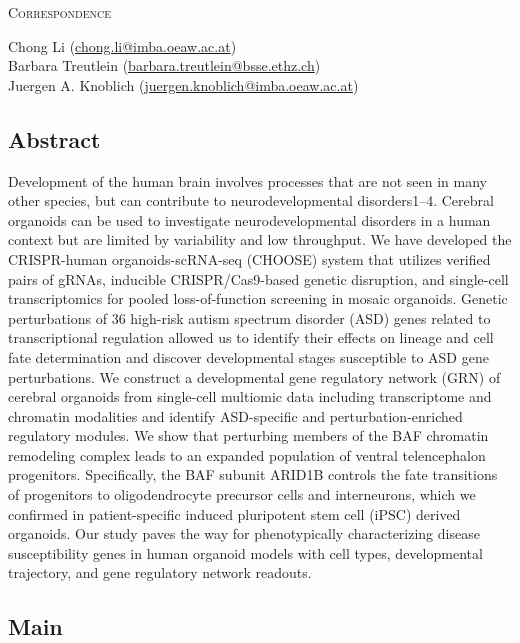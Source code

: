 \noindent
{\large\textsc{Correspondence}} 

\noindent
Chong Li (\href{mailto:chong.li@imba.oeaw.ac.at}{chong.li@imba.oeaw.ac.at})\\
Barbara Treutlein (\href{mailto:barbara.treutlein@bsse.ethz.ch}{barbara.treutlein@bsse.ethz.ch})\\
Juergen A. Knoblich (\href{mailto:juergen.knoblich@imba.oeaw.ac.at}{juergen.knoblich@imba.oeaw.ac.at})

\clearpage



\subsection{Abstract}
Development of the human brain involves processes that are not seen in many other species, but can contribute to neurodevelopmental disorders1–4. Cerebral organoids can be used to investigate neurodevelopmental disorders in a human context but are limited by variability and low throughput. We have developed the CRISPR-human organoids-scRNA-seq (CHOOSE) system that utilizes verified pairs of gRNAs, inducible CRISPR/Cas9-based genetic disruption, and single-cell transcriptomics for pooled loss-of-function screening in mosaic organoids. Genetic perturbations of 36 high-risk autism spectrum disorder (ASD) genes related to transcriptional regulation allowed us to identify their effects on lineage and cell fate determination and discover developmental stages susceptible to ASD gene perturbations. We construct a developmental gene regulatory network (GRN) of cerebral organoids from single-cell multiomic data including transcriptome and chromatin modalities and identify ASD-specific and perturbation-enriched regulatory modules. We show that perturbing members of the BAF chromatin remodeling complex leads to an expanded population of ventral telencephalon progenitors. Specifically, the BAF subunit ARID1B controls the fate transitions of progenitors to oligodendrocyte precursor cells and interneurons, which we confirmed in patient-specific induced pluripotent stem cell (iPSC) derived organoids. Our study paves the way for phenotypically characterizing disease susceptibility genes in human organoid models with cell types, developmental trajectory, and gene regulatory network readouts.

\subsection{Main}

